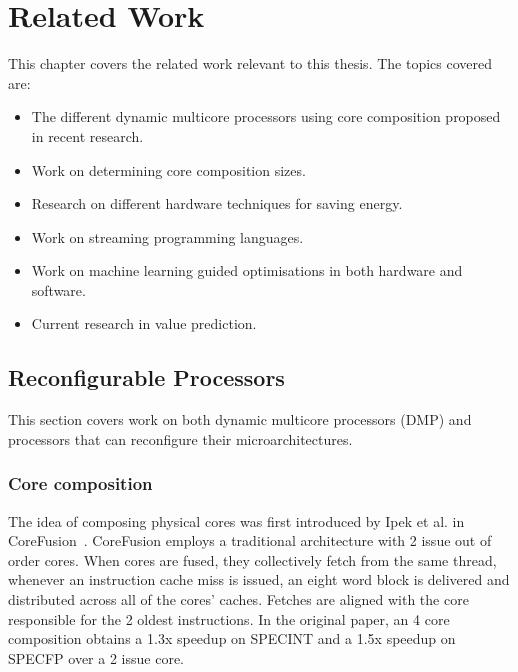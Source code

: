 \chapter{Related Work}
This chapter covers the related work relevant to this thesis.
The topics covered are:
\begin{itemize}
\item The different dynamic multicore processors using core composition proposed in recent research.
\vspace{-1em}
\item Work on determining core composition sizes.
\vspace{-1em}
\item Research on different hardware techniques for saving energy.
\vspace{-1em}
\item Work on streaming programming languages.
\vspace{-1em}
\item Work on machine learning guided optimisations in both hardware and software.
\vspace{-1em}
\item Current research in value prediction.
\end{itemize}

\section{Reconfigurable Processors}

This section covers work on both dynamic multicore processors (DMP) and processors that can reconfigure their microarchitectures.

\subsection{Core composition}
The idea of composing physical cores was first introduced by Ipek et al. in CoreFusion~\cite{ipek2007CoreFusion}.
CoreFusion employs a traditional architecture with 2 issue out of order cores.
When cores are fused, they collectively fetch from the same thread, whenever an instruction cache miss is issued, an eight word block is delivered and distributed across all of the cores' caches.
Fetches are aligned with the core responsible for the 2 oldest instructions.
In the original paper, an 4 core composition obtains a 1.3x speedup on SPECINT and a 1.5x speedup on SPECFP over a 2 issue core.
 
